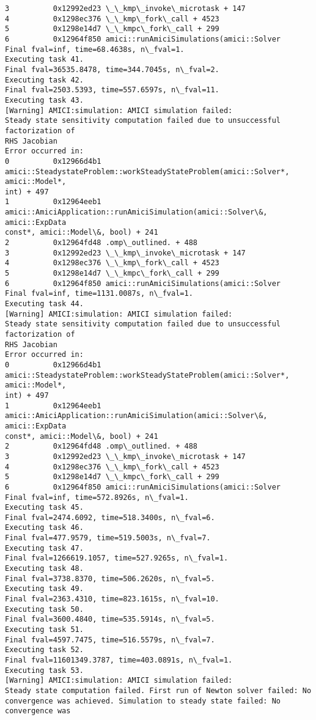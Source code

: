 \documentclass[11pt]{article}
\begin{document}
\begin{Verbatim}[commandchars=\\\{\}]
3          0x12992ed23 \_\_kmp\_invoke\_microtask + 147
4          0x1298ec376 \_\_kmp\_fork\_call + 4523
5          0x1298e14d7 \_\_kmpc\_fork\_call + 299
6          0x12964f850 amici::runAmiciSimulations(amici::Solver
Final fval=inf, time=68.4638s, n\_fval=1.
Executing task 41.
Final fval=36535.8478, time=344.7045s, n\_fval=2.
Executing task 42.
Final fval=2503.5393, time=557.6597s, n\_fval=11.
Executing task 43.
[Warning] AMICI:simulation: AMICI simulation failed:
Steady state sensitivity computation failed due to unsuccessful factorization of
RHS Jacobian
Error occurred in:
0          0x12966d4b1
amici::SteadystateProblem::workSteadyStateProblem(amici::Solver*, amici::Model*,
int) + 497
1          0x12964eeb1
amici::AmiciApplication::runAmiciSimulation(amici::Solver\&, amici::ExpData
const*, amici::Model\&, bool) + 241
2          0x12964fd48 .omp\_outlined. + 488
3          0x12992ed23 \_\_kmp\_invoke\_microtask + 147
4          0x1298ec376 \_\_kmp\_fork\_call + 4523
5          0x1298e14d7 \_\_kmpc\_fork\_call + 299
6          0x12964f850 amici::runAmiciSimulations(amici::Solver
Final fval=inf, time=1131.0087s, n\_fval=1.
Executing task 44.
[Warning] AMICI:simulation: AMICI simulation failed:
Steady state sensitivity computation failed due to unsuccessful factorization of
RHS Jacobian
Error occurred in:
0          0x12966d4b1
amici::SteadystateProblem::workSteadyStateProblem(amici::Solver*, amici::Model*,
int) + 497
1          0x12964eeb1
amici::AmiciApplication::runAmiciSimulation(amici::Solver\&, amici::ExpData
const*, amici::Model\&, bool) + 241
2          0x12964fd48 .omp\_outlined. + 488
3          0x12992ed23 \_\_kmp\_invoke\_microtask + 147
4          0x1298ec376 \_\_kmp\_fork\_call + 4523
5          0x1298e14d7 \_\_kmpc\_fork\_call + 299
6          0x12964f850 amici::runAmiciSimulations(amici::Solver
Final fval=inf, time=572.8926s, n\_fval=1.
Executing task 45.
Final fval=2474.6092, time=518.3400s, n\_fval=6.
Executing task 46.
Final fval=477.9579, time=519.5003s, n\_fval=7.
Executing task 47.
Final fval=1266619.1057, time=527.9265s, n\_fval=1.
Executing task 48.
Final fval=3738.8370, time=506.2620s, n\_fval=5.
Executing task 49.
Final fval=2363.4310, time=823.1615s, n\_fval=10.
Executing task 50.
Final fval=3600.4840, time=535.5914s, n\_fval=5.
Executing task 51.
Final fval=4597.7475, time=516.5579s, n\_fval=7.
Executing task 52.
Final fval=11601349.3787, time=403.0891s, n\_fval=1.
Executing task 53.
[Warning] AMICI:simulation: AMICI simulation failed:
Steady state computation failed. First run of Newton solver failed: No
convergence was achieved. Simulation to steady state failed: No convergence was

\end{Verbatim}
\end{document}
